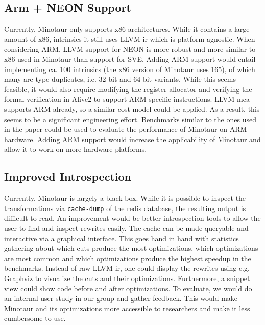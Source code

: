 	\subsection{Arm + NEON Support}
	Currently, Minotaur only supports x86 architectures.
	While it contains a large amount of x86, intrinsics it still uses LLVM \gls*{ir} which is platform-agnostic.
	When considering ARM, LLVM support for NEON is more robust and more similar to x86 used in Minotaur than support for SVE.
	Adding ARM support would entail implementing ca. 100 intrinsics (the x86 version of Minotaur uses 165), of which many are type duplicates, i.e. 32 bit and 64 bit variants.
	While this seems feasible, it would also require modifying the register allocator and verifying the formal verification in Alive2 to support ARM specific instructions.
	LLVM \gls*{mca} supports ARM already, so a similar cost model could be applied.
	As a result, this seems to be a significant engineering effort.
	Benchmarks similar to the ones used in the paper could be used to evaluate the performance of Minotaur on ARM hardware.
	Adding ARM support would increase the applicability of Minotaur and allow it to work on more hardware platforms.

	\subsection{Improved Introspection}
	Currently, Minotaur is largely a black box.
	While it is possible to inspect the transformations via \texttt{cache-dump} of the redis database, the resulting output is difficult to read.
	An improvement would be better introspection tools to allow the user to find and inspect rewrites easily.
	The cache can be made queryable and interactive via a graphical interface.
	This goes hand in hand with statistics gathering about which cuts produce the most optimizations, which optimizations are most common and which optimizations produce the highest speedup in the benchmarks.
	Instead of raw LLVM \gls*{ir}, one could display the rewrites using e.g. Graphviz to visualize the cuts and their optimizations.
	Furthermore, a snippet view could show code before and after optimizations.
	To evaluate, we would do an internal user study in our group and gather feedback.
	This would make Minotaur and its optimizations more accessible to researchers and make it less cumbersome to use.


